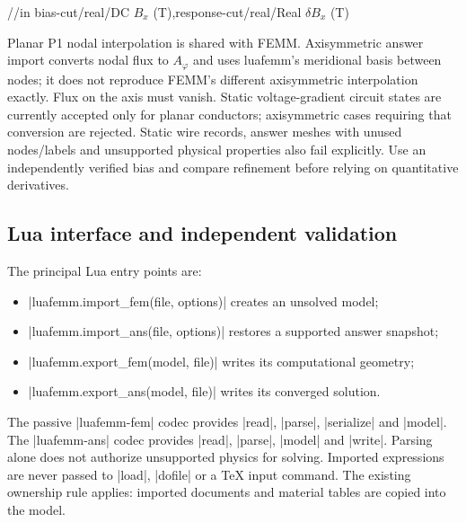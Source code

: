 \begin{codeexample}[width=0pt]
\foreach \Profile/\View/\Title in
  {bias-cut/real/{DC $B_x$ (T)},response-cut/real/{Real $\delta B_x$ (T)}}{
\begin{tikzpicture}
\begin{axis}[width=7.2cm,height=5.2cm,grid=major,
  xlabel={$x$ along the upper limb (mm)},ylabel={\Title}]
  \femmplot[profile=\Profile,abscissa=x,component=Bx,representation=\View,
    plot options={blue!70!black,thick,mark=none}]
\end{axis}
\end{tikzpicture}}
\end{codeexample}


Planar P1 nodal interpolation is shared with FEMM. Axisymmetric answer import
converts nodal flux to $A_\varphi$ and uses luafemm's meridional basis between
nodes; it does not reproduce FEMM's different axisymmetric interpolation exactly.
Flux on the axis must vanish. Static voltage-gradient circuit states are currently
accepted only for planar conductors; axisymmetric cases requiring that conversion
are rejected. Static wire records, answer meshes with unused nodes/labels and
unsupported physical properties also fail explicitly. Use an independently
verified bias and compare refinement before relying on quantitative derivatives.

\subsection{Lua interface and independent validation}

The principal Lua entry points are:
\begin{itemize}
\item |luafemm.import_fem(file, options)| creates an unsolved model;
\item |luafemm.import_ans(file, options)| restores a supported answer snapshot;
\item |luafemm.export_fem(model, file)| writes its computational geometry;
\item |luafemm.export_ans(model, file)| writes its converged solution.
\end{itemize}
The passive |luafemm-fem| codec provides |read|, |parse|, |serialize| and |model|.
The |luafemm-ans| codec provides |read|, |parse|, |model| and |write|. Parsing
alone does not authorize unsupported physics for solving. Imported expressions are
never passed to |load|, |dofile| or a TeX input command. The existing ownership
rule applies: imported documents and material tables are copied into the model.

